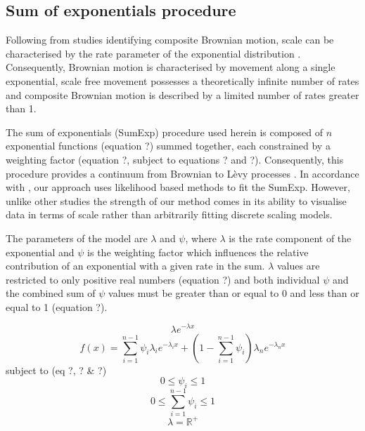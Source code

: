 \documentclass[11pt,usenames,dvipsnames,a4paper]{article}
\begin{document}
\subsection{Sum of exponentials procedure}

\begin{linenumbers}
\hspace{\parindent}
Following from studies identifying composite Brownian motion, scale can be characterised by the rate parameter of the exponential distribution \citep{Petrovskii2011, Jansen2012}. Consequently, Brownian motion is characterised by movement along a single exponential, scale free movement possesses a theoretically infinite number of rates and composite Brownian motion is described by a limited number of rates greater than 1. 

The sum of exponentials (SumExp) procedure used herein is composed of $n$ exponential functions (equation ?) summed together, each constrained by a weighting factor (equation ?, subject to equations ? and ?). Consequently, this procedure provides a continuum from Brownian to L\`evy processes \citep{Jansen2012}. In accordance with \cite{Murphy2007}, our approach uses likelihood based methods to fit the SumExp. However, unlike other studies \citep{Petrovskii2011, Jansen2012, Sakamoto2017, Gautestad2012, Zhao2016} the strength of our method comes in its ability to visualise data in terms of scale rather than arbitrarily fitting discrete scaling models.

The parameters of the model are $\lambda$ and $\psi$, where $\lambda$ is the rate component of the exponential and $\psi$ is the weighting factor which influences the relative contribution of an exponential with a given rate in the sum. $\lambda$ values are restricted to only positive real numbers (equation ?) and both individual $\psi$ and the combined sum of $\psi$ values must be greater than or equal to 0 and less than or equal to 1 (equation ?).
\end{linenumbers}

\begin{equation}
\lambda e^{-\lambda x}
\end{equation}
\begin{equation}
f(x) = \sum_{i=1}^{n-1} \psi_i \lambda_i e^{-\lambda_i x} + \left(1 - \sum_{i=1}^{n-1}\psi_i\right) \lambda_n e^{-\lambda_n x}
\end{equation}
subject to (eq ?, ? \& ?)
\begin{equation}
0\leq \psi_i \leq 1
\end{equation}
\begin{equation}
0\leq \sum_{i=1}^{n-1}\psi_i \leq 1
\end{equation}
\begin{equation}
\lambda = \mathbb{R}^+
\end{equation}
\end{document}
